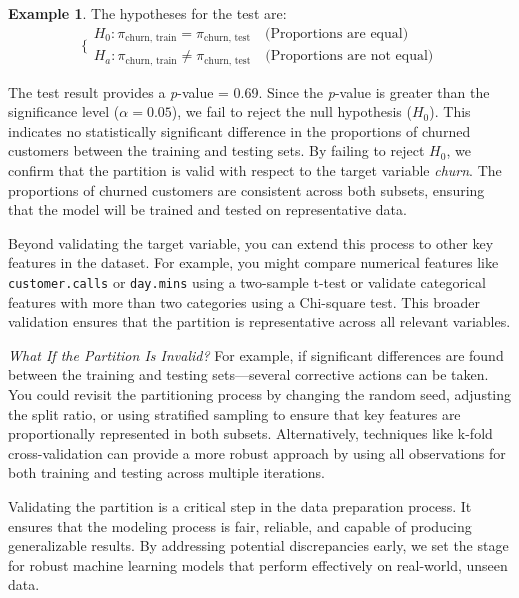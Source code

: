 \documentclass[
]{book}
\newcommand{\passthrough}[1]{#1}
\theoremstyle{definition}
\theoremstyle{definition}
\newtheorem{example}{Example}[chapter]
\theoremstyle{definition}
\theoremstyle{definition}
\theoremstyle{remark}
\begin{document}
\begin{example}
The hypotheses for the test are:\\
\[
\bigg\{
\begin{matrix}
H_0:  \pi_{\text{churn, train}} = \pi_{\text{churn, test}} \quad \text{(Proportions are equal)} \\
H_a:  \pi_{\text{churn, train}} \neq \pi_{\text{churn, test}} \quad \text{(Proportions are not equal)}
\end{matrix}
\]

The test result provides a \emph{p}-value = 0.69. Since the \emph{p}-value is greater than the significance level (\(\alpha = 0.05\)), we fail to reject the null hypothesis (\(H_0\)). This indicates no statistically significant difference in the proportions of churned customers between the training and testing sets. By failing to reject \(H_0\), we confirm that the partition is valid with respect to the target variable \emph{churn}. The proportions of churned customers are consistent across both subsets, ensuring that the model will be trained and tested on representative data.
\end{example}

Beyond validating the target variable, you can extend this process to other key features in the dataset. For example, you might compare numerical features like \passthrough{\lstinline!customer.calls!} or \passthrough{\lstinline!day.mins!} using a two-sample t-test or validate categorical features with more than two categories using a Chi-square test. This broader validation ensures that the partition is representative across all relevant variables.

\emph{What If the Partition Is Invalid?} For example, if significant differences are found between the training and testing sets---several corrective actions can be taken. You could revisit the partitioning process by changing the random seed, adjusting the split ratio, or using stratified sampling to ensure that key features are proportionally represented in both subsets. Alternatively, techniques like k-fold cross-validation can provide a more robust approach by using all observations for both training and testing across multiple iterations.

Validating the partition is a critical step in the data preparation process. It ensures that the modeling process is fair, reliable, and capable of producing generalizable results. By addressing potential discrepancies early, we set the stage for robust machine learning models that perform effectively on real-world, unseen data.
\end{document}
